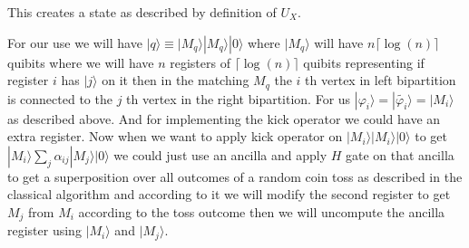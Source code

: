 \begin{flushleft}
	This creates a state as described by definition of $U_X$.\\
	\begin{flushleft}
		For our use we will have $|q\rangle \equiv |M_q\rangle |M_q\rangle |0\rangle$ where $|M_q\rangle$ will have $n\lceil\log(n)\rceil$ quibits where we will have $n$ registers of $\lceil\log(n)\rceil$ quibits representing if register $i$ has $|j\rangle$  on it then in the matching $M_q$ the $i$ th vertex in left bipartition is connected to the $j$ th vertex in the right bipartition. For us $|\varphi_i\rangle=|\tilde{\varphi_i}\rangle=|M_i\rangle $ as described above. And for implementing the kick operator we could have an extra register. Now when we want to apply kick operator on $|M_i\rangle|M_i\rangle|0\rangle$ to get $|M_i\rangle\sum_j \alpha_{ij}|M_j\rangle |0\rangle$ we could just use an ancilla and apply $H $ gate on that ancilla to get a superposition over all outcomes of a random coin toss as described in the classical algorithm and according to it we will modify the second register to get $M_j$ from $M_i$ according to the toss outcome then we will uncompute the ancilla register using $|M_i\rangle$ and $|M_j\rangle$.
	\end{flushleft}

	
\end{flushleft}

